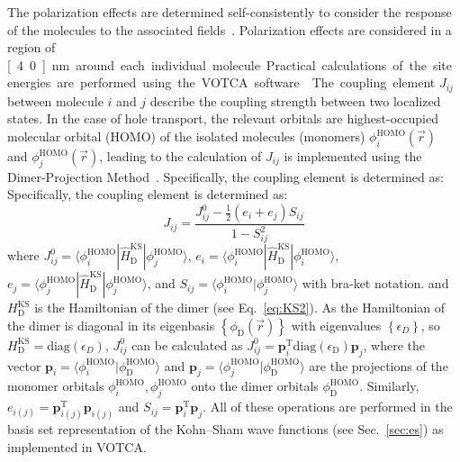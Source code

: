 \documentclass[%
 reprint,
 amsmath,amssymb,
 aps,
]{revtex4-2}
\begin{document}
The polarization effects are determined self-consistently to consider the response of the molecules to the associated fields~\cite{thole_molecular_1981}.
Polarization effects are considered in a region of \unit[4.0]{nm} around each individual molecule. Practical calculations of the site energies are performed using the VOTCA software~\cite{Baumeier2011,doi:10.1021/acs.jctc.8b00617,10.1063/1.5144277,Baumeier2024}.


The coupling element $J_{ij}$ between molecule $i$ and $j$ describe the coupling strength between two localized states. In the case of hole transport, the relevant orbitals are highest-occupied molecular orbital (HOMO) of the isolated molecules (monomers) $\phi^\text{HOMO}_i(\vec{r})$ and $\phi^\text{HOMO}_j(\vec{r})$, 
leading to the calculation of $J_{ij}$ is implemented using the Dimer-Projection Method~\cite{baumeier_density_2010}. Specifically, the coupling element is determined as:
Specifically, the coupling element is determined as: 
%
\begin{equation}
    J_{ij} = \frac{ J^0_{ij}- \frac{1}{2}(e_i+e_j) S_{ij} }{ 1- S_{ij}^2 }
    \label{equ:JAB}
\end{equation}
%
where $J^0_{ij} = \langle \phi^\text{HOMO}_i | \hat{H}^\text{KS}_\text{D} | \phi^\text{HOMO}_j \rangle $, $e_i = \langle \phi^\text{HOMO}_i | \hat{H}^\text{KS}_\text{D} | \phi^\text{HOMO}_i \rangle $, $e_j = \langle \phi^\text{HOMO}_j | \hat{H}^\text{KS}_\text{D} | \phi^\text{HOMO}_j \rangle $, and $S_{ij}=\langle \phi^\text{HOMO}_i | \phi^\text{HOMO}_j \rangle $ with bra-ket notation. 
and $H^\text{KS}_\text{D}$ is the Hamiltonian of the dimer (see Eq.~\ref{eq:KS2}). 
As the Hamiltonian of the dimer is diagonal in its eigenbasis $\left\{ \phi_\text{D}(\vec{r})\right\}$ with eigenvalues $\left\{ \epsilon_D\right\}$, so $H^\text{KS}_\text{D} = \text{diag}(\epsilon_D)$, $J^0_{ij}$ can be calculated as $J^0_{ij} = \mathbf{p}_i^\text{T} \text{diag}(\epsilon_\text{D}) \mathbf{p}_j$,  where the vector $\mathbf{p}_i = \langle \phi_i^\text{HOMO} | \phi^\text{HOMO}_\text{D} \rangle$ and $\mathbf{p}_j = \langle \phi_j^\text{HOMO} | \phi_\text{D}^\text{HOMO} \rangle$ are the projections of the monomer orbitals $\phi_i^\text{HOMO}, \phi_j^\text{HOMO}$ onto the dimer orbitals $\phi^\text{HOMO}_\text{D}$. Similarly, $e_{i(j)} = \mathbf{p}_{i(j)}^\text{T} \mathbf{p}_{i(j)}$ and $S_{ij} =  \mathbf{p}_i^\text{T} \mathbf{p}_j$. All  of these operations are performed in the basis set representation of the Kohn--Sham wave functions (see Sec.~\ref{sec:es}) as implemented in VOTCA.
\end{document}
